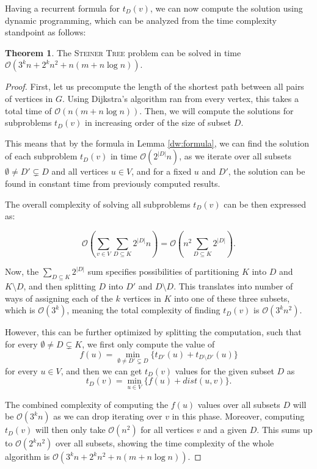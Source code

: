 \documentclass[thesis=M,english,hidelinks]{FITthesis}[2012/10/20]
\theoremstyle{definition}
\newtheorem{theorem}{Theorem}
\begin{document}
Having a recurrent formula for $t_D(v)$, we can now compute the solution using dynamic programming, which can be
analyzed from the time complexity standpoint as follows:

\begin{theorem}
    \label{dw:complexity}
    The \textsc{Steiner Tree} problem can be solved in time $\mathcal{O}(3^k n + 2^k n^2 + n(m + n \log n))$.
\end{theorem}

\begin{proof}
    First, let us precompute the length of the shortest path between all pairs of vertices in $G$. Using Dijkstra's
    algorithm \cite{Dijkstra1959} ran from every vertex, this takes a total time of $\mathcal{O}(n(m + n \log n))$. Then,
    we will compute the solutions for subproblems $t_D(v)$ in increasing order of the size of subset $D$.

    This means that by the formula in Lemma \ref{dw:formula}, we can find the solution of each subproblem $t_D(v)$ in
    time $\mathcal{O}(2^{|D|}n)$, as we iterate over all subsets $\emptyset \neq D' \subsetneq D$ and all vertices $u \in
    V$, and for a fixed $u$ and $D'$, the solution can be found in constant time from previously computed results.

    The overall complexity of solving all subproblems $t_D(v)$ can be then expressed as:

    $$
    \mathcal{O}(\sum_{v \in V} \sum_{D \subseteq K} 2^{|D|} n) = \mathcal{O}(n^2 \sum_{D \subseteq K} 2^{|D|}).
    $$

    Now, the $\sum_{D \subseteq K} 2^{|D|}$ sum specifies possibilities of partitioning $K$ into $D$ and $K
    \setminus D$, and then splitting $D$ into $D'$ and $D \setminus D$. This translates into number of ways of assigning
    each of the $k$ vertices in $K$ into one of these three subsets, which is $\mathcal{O}(3^k)$, meaning the total
    complexity of finding $t_D(v)$ is $\mathcal{O}(3^k n^2)$.

    However, this can be further optimized by splitting the computation, such that for every $\emptyset \neq D
    \subsetneq K$, we first only compute the value of
    $$
    f(u) = \min_{\emptyset \neq D' \subsetneq D} \{ t_{D'}(u) + t_{D \setminus D'}(u) \}
    $$
    for every $u \in V$, and then we can get $t_D(v)$ values for the given subset $D$ as
    $$
    t_D(v) = \min_{u \in V} \{ f(u) + dist(u, v) \}.
    $$

    The combined complexity of computing the $f(u)$ values over all subsets $D$ will be $\mathcal{O}(3^k n)$ as we can
    drop iterating over $v$ in this phase. Moreover, computing $t_D(v)$ will then only take $\mathcal{O}(n^2)$ for all
    vertices $v$ and a given $D$. This sums up to $\mathcal{O}(2^k n^2)$ over all subsets, showing the time
    complexity of the whole algorithm is $\mathcal{O}(3^k n + 2^k n^2 + n (m + n \log n))$.
\end{proof}
\end{document}
